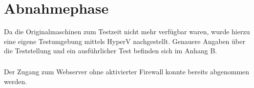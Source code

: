 \section{Abnahmephase} 
\label{sec:Abnahmephase}
Da die Originalmaschinen zum Testzeit nicht mehr verfügbar waren, wurde hierzu eine eigene Testumgebung mittels HyperV nachgestellt. Genauere Angaben über die Teststellung und ein ausführlicher Test befinden sich im Anhang B.

\subparagraph*{} Der Zugang zum Webserver ohne aktivierter Firewall konnte bereits abgenommen werden.

